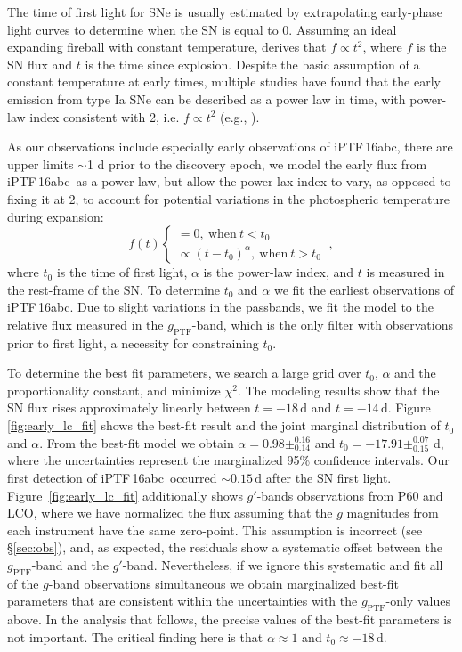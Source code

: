 \documentclass[twocolumn]{aastex61}
\newcommand{\abc}{iPTF\,16abc}
\begin{document}
The time of first light for SNe is usually estimated by 
extrapolating early-phase light curves to determine when the 
SN is equal to 0. Assuming an ideal expanding fireball with 
constant temperature, \citet{1982ApJ...253..785A} derives that $f 
\propto t^2$, where $f$ is the SN flux and $t$ is the time since 
explosion. Despite the basic assumption of a constant temperature at 
early times, multiple studies have found that the early emission 
from type Ia SNe can be described as a power law in time, with 
power-law index consistent with 2, i.e. $f \propto t^2$ (e.g., \citep{2006AJ....132.1707C, 2010ApJ...712..350H, 2011MNRAS.416.2607G}).

As our observations include especially early observations of \abc, there are upper limits $\sim$1 d prior to the discovery epoch, we model the early flux from \abc\ as a power law, but allow the power-lax index to vary, as opposed to fixing it at 2, to account for potential variations in the photospheric temperature during expansion:
\begin{equation}
  \label{eq:broken_power_law}
  f(t) \left\{
    \begin{array}{ll}
      = 0,\ \textrm{when}\ t<t_0 \\
      \propto (t-t_0)^{\alpha},\ \textrm{when}\ t>t_0
    \end{array}
  \right.\ ,
\end{equation}
where $t_0$ is the time of first light, $\alpha$ is the power-law index, and $t$ is measured in the rest-frame of the SN. To determine $t_0$ and $\alpha$ we fit the earliest observations of \abc. Due to slight variations in the passbands, we fit the model to the relative flux measured in the $g_\mathrm{PTF}$-band, which is the only filter with observations prior to first light, a necessity for constraining $t_0$. 

To determine the best fit parameters, we search a large grid over $t_0$, $\alpha$
and the proportionality constant, and minimize $\chi^2$. 
The modeling results show that the SN flux rises approximately
linearly between
$t=-18\,\textrm{d}$ and $t=-14\,\textrm{d}$. Figure \ref{fig:early_lc_fit} shows the best-fit result and
the joint marginal distribution of $t_0$ and $\alpha$. From the
best-fit model we obtain $\alpha=0.98 \pm ^{0.16}_{0.14}$ and $t_0=-17.91 \pm ^{0.07}_{0.15}$ d, where the uncertainties represent the marginalized 95\% confidence intervals. Our first
detection of \abc\ occurred $\sim{0.15}\,\textrm{d}$ after 
the SN first light. Figure~\ref{fig:early_lc_fit} additionally shows $g'$-bands observations from P60 and LCO, where we have normalized the flux assuming that the $g$ magnitudes from each instrument have the same zero-point. This assumption is incorrect (see \S\ref{sec:obs}), and, as expected, the residuals show a systematic offset between the $g_\mathrm{PTF}$-band and the $g'$-band. Nevertheless, if we ignore this systematic and fit all of the $g$-band observations simultaneous we obtain marginalized best-fit parameters that are consistent within the uncertainties with the $g_\mathrm{PTF}$-only values above. In the analysis that follows, the precise values of the best-fit parameters is not important. The critical finding here is that $\alpha \approx 1$ and $t_0 \approx -18 \, \mathrm{d}$. 
\end{document}
